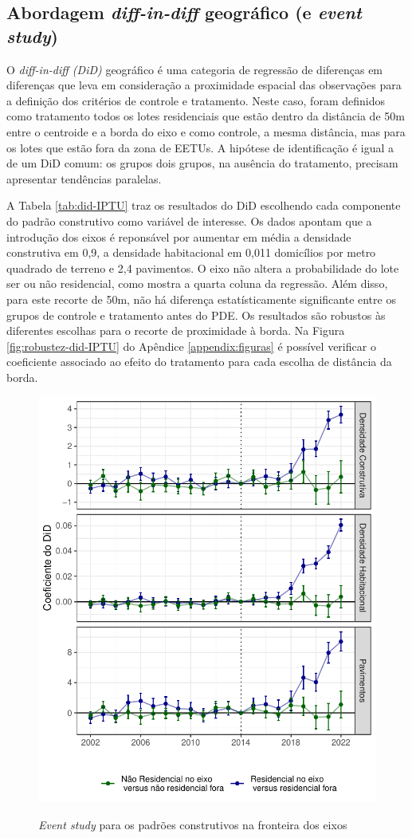 \subsection{Abordagem \textit{diff-in-diff} geográfico (e \textit{event study})}

O \textit{diff-in-diff (DiD)} geográfico é uma categoria de regressão de diferenças em diferenças que leva em consideração a proximidade espacial das observações para a definição dos critérios de controle e tratamento. Neste caso, foram definidos como tratamento todos os lotes residenciais que estão dentro da distância de 50m entre o centroide e a borda do eixo e como controle, a mesma distância, mas para os lotes que estão fora da zona de EETUs. A hipótese de identificação é igual a de um DiD comum: os grupos dois grupos, na ausência do tratamento, precisam apresentar tendências paralelas. 



A Tabela \ref{tab:did-IPTU} traz os resultados do DiD escolhendo cada componente do padrão construtivo como variável de interesse. Os dados apontam que a introdução dos eixos é reponsável por aumentar em média a densidade construtiva em 0,9, a densidade habitacional em 0,011 domicílios por metro quadrado de terreno e 2,4 pavimentos. O eixo não altera a probabilidade do lote ser ou não residencial, como mostra a quarta coluna da regressão. Além disso, para este recorte de 50m, não há diferença estatísticamente significante entre os grupos de controle e tratamento antes do PDE. Os resultados são robustos às diferentes escolhas para o recorte de proximidade à borda. Na Figura \ref{fig:robustez-did-IPTU} do Apêndice \ref{appendix:figuras} é possível verificar o coeficiente associado ao efeito do tratamento para cada escolha de distância da borda. 

\begin{figure}[h]
    \centering
    \caption{\textit{Event study} para os padrões construtivos na fronteira dos eixos}
    \includegraphics[width = .7\textwidth]{figuras/event-study.pdf}
    \label{fig:event-study}
\end{figure}

